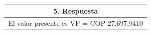 \begin{center}
\begin{longtable}[H]{|p{0.333\linewidth}|p{0.3333\linewidth}|p{0.3333\linewidth}|}
  \multicolumn{3}{|c|}{\cellcolor[HTML]{FFB183}\textbf{5. Respuesta}}                                                                                                                                \\ \hline
  \multicolumn{3}{|c|}{El valor presente es VP =  COP 27.697,9410}                                                                                                                                      \\ \hline
 \end{longtable}
\end{center}

